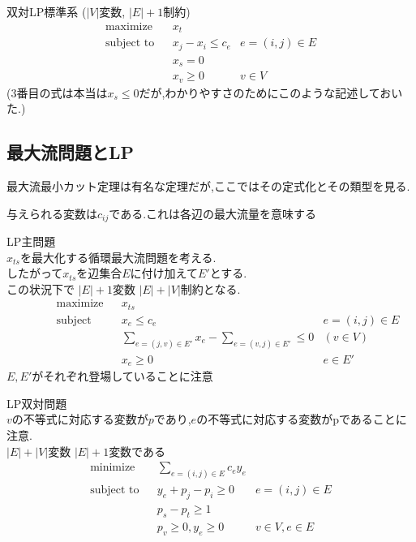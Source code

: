 \documentclass[13pt, a4paper, landscape]{jarticle}
\theoremstyle{nonitalic} %
\begin{document}
双対LP標準系
($|V|$変数, $|E|+1$制約)
\begin{align}
 &&&&&\textrm{maximize}   && x_t  \\
 &&&&&\textrm{subject to} && x_j - x_i\leq c_e & e = (i,j) \in E  &&&&&\\
 &&&&&                    && x_s = 0 &&&&&& \\
 &&&&&                    && x_v \geq 0 & v \in V &&&&&
\end{align}
(3番目の式は本当は$x_s \leq 0$だが,わかりやすさのためにこのような記述しておいた.) \\


\subsection{最大流問題とLP}
最大流最小カット定理は有名な定理だが,ここではその定式化とその類型を見る.

与えられる変数は$c_{ij}$である.これは各辺の最大流量を意味する

LP主問題 \\
$x_{ts}$を最大化する循環最大流問題を考える. \\
したがって$x_{ts}$を辺集合$E$に付け加えて$E'$とする.\\
この状況下で $|E|+1$変数 $|E|+|V|$制約となる.
\begin{align}
 &&&&&\textrm{maximize}   && x_{ts}  \\
 &&&&&\textrm{subject to} && x_e\leq c_e & e = (i,j) \in E  &&&&&\\
 &&&&&                    && \sum_{e = (j,v) \in E'} x_e - \sum_{e=(v,j) \in E'} \leq 0 & (v \in V) &&&&& \\
 &&&&&                    && x_e \geq 0 & e \in E' &&&&&
\end{align}
$E, E'$がそれぞれ登場していることに注意


LP双対問題 \\
$v$の不等式に対応する変数が$p$であり,$e$の不等式に対応する変数がpであることに注意.\\
$|E|+|V|$変数 $|E|+1$変数である
\begin{align}
 &&&&&\textrm{minimize}   && \sum_{e=(i,j)\in E} c_e y_e  \\
 &&&&&\textrm{subject to} && y_e + p_j - p_i \geq 0 &  e = (i, j) \in E  &&&&&\\
 &&&&&                    && p_s - p_t  \geq 1         &&&&& \\
 &&&&&                    && p_v \geq 0,  y_e \geq 0 &  v \in V, e \in E &&&&&
\end{align}
\end{document}
